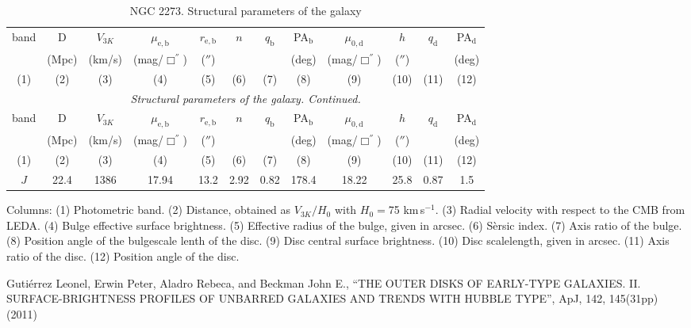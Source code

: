 \documentclass[english,10pt]{article}
\def\mm{\mathrm}
\begin{document}
\begin{longtable}[c]{cccccccccccc}
\caption{NGC 2273. Structural parameters of the galaxy} \\ 
\hline 
band & D & $V_{3K}$ & 
$\mu_\mm{e,b}$ & $r_\mm{e,b}$ & $n$ & $q_\mm{b}$ & PA$_\mm{b}$ & 
$\mu_\mm{0,d}$ & $h$ & $q_\mm{d}$ & PA$_\mm{d}$ \\ 
& (Mpc) & (km/s) & 
(mag/$\Box^{''}$) & ($''$) & & & (deg) & 
(mag/$\Box^{''}$) & ($''$) & & (deg) \\
(1)&(2)&(3)&(4)&(5)&(6)&(7)&(8)&(9)&(10)&(11)&(12) \\ 
\hline
\endfirsthead 
\hline
\multicolumn{12}{c}{\small\slshape Structural parameters of the galaxy. 
Continued. } \\ \hline
band & D & $V_{3K}$ & 
$\mu_\mm{e,b}$ & $r_\mm{e,b}$ & $n$ & $q_\mm{b}$ & PA$_\mm{b}$ & 
$\mu_\mm{0,d}$ & $h$ & $q_\mm{d}$ & PA$_\mm{d}$ \\ 
& (Mpc) & (km/s) & 
(mag/$\Box^{''}$) & ($''$) & & & (deg) & 
(mag/$\Box^{''}$) & ($''$) & & (deg) \\
(1)&(2)&(3)&(4)&(5)&(6)&(7)&(8)&(9)&(10)&(11)&(12) \\
\hline
\endhead 
\hline
$J$ & 22.4 & 1386 &
17.94 & 13.2 & 2.92 & 0.82 & 178.4 & 
18.22 & 25.8 & 0.87 & 1.5 \tabularnewline
\hline
\end{longtable}

Columns: 
(1) Photometric band. 
(2) Distance, obtained as $V_{3K}/H_0$ with $H_0=$75 km\,s$^{-1}$.
(3) Radial velocity with respect to the CMB from LEDA.
(4) Bulge effective surface brightness. 
(5) Effective radius of the bulge, given in arcsec.
(6) S\`ersic index. 
(7) Axis ratio of the bulge.
(8) Position angle of the bulgescale lenth of the disc.
(9) Disc central surface brightness. 
(10) Disc scalelength, given in arcsec.
(11) Axis ratio of the disc.
(12) Position angle of the disc. 

\newpage
\noindent
Guti\'{e}rrez Leonel, Erwin Peter, Aladro Rebeca, and 
Beckman John E., 
``THE OUTER DISKS OF EARLY-TYPE GALAXIES. 
II. SURFACE-BRIGHTNESS PROFILES OF UNBARRED GALAXIES AND TRENDS 
WITH HUBBLE TYPE'', 
ApJ, 142, 145(31pp) (2011)
\end{document}
